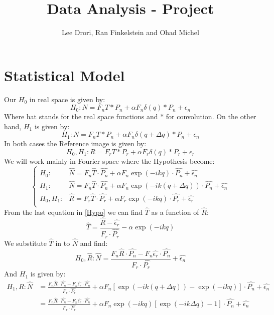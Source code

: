 \documentclass[a4paper]{article}
\title{Data Analysis - Project}
\author{Lee Drori, Ran Finkelstein and Ohad Michel}
\newcommand{\rb}[1]{\left(#1\right)}
\newcommand{\sqb}[1]{\left[#1\right]}
\begin{document}
	\maketitle
	
	\section{Statistical Model}
	Our $H_0$ in real space is given by:
	\begin{equation}
	H_0 : N = F_n T * P_n + \alpha F_n \delta \rb{q} * P_n + \epsilon_n  
	\end{equation}
	Where hat stands for the real space functions and $*$ for convolution. On the other hand, $H_1$ is given by:
	\begin{equation}
	H_1 : N = F_n T * P_n + \alpha F_n \delta \rb{q + \Delta q} * P_n + \epsilon_n
	\end{equation}
	In both cases the Reference image is given by:
	\begin{equation}
	H_0,H_1 : R = F_r T * P_r + \alpha F_r \delta \rb{q} * P_r + \epsilon_r
	\end{equation}
	We will work mainly in Fourier space where the Hypothesis become:
	\begin{equation}\label{Hypo}
	\begin{cases}
	H_0: & \hat{N} = F_n \hat{T} \cdot \hat{P_n} + \alpha F_n \exp\rb{-ikq}\cdot \hat{P_n} + \hat{\epsilon_n}\\
	H_1: & \hat{N} = F_n \hat{T} \cdot \hat{P_n} + \alpha F_n \exp\rb{-ik\rb{q + \Delta q}}\cdot \hat{P_n} + \hat{\epsilon_n}\\
	H_0,H_1: & \hat{R} = F_r \hat{T} \cdot \hat{P_r} + \alpha F_r \exp\rb{-ikq}\cdot \hat{P_r} + \hat{\epsilon_r}\\
	\end{cases}
	\end{equation}
	From the last equation in \eqref{Hypo} we can find $\hat{T}$ as a function of $\hat{R}$:
	\begin{equation}
	\hat{T} = \frac{\hat{R} - \hat{\epsilon_r}}{F_r\cdot \hat{P_r}} -\alpha \exp\rb{-ikq}
	\end{equation}
	We substitute $\hat{T}$ in to $\hat{N}$ and find:
	\begin{equation}
	H_0,\hat{R} : \hat{N} = \frac{F_n \hat{R}\cdot \hat{P_n} - F_n \hat{\epsilon_r}\cdot \hat{P_n}}{F_r\cdot \hat{P_r}} + \hat{\epsilon_n}  
	\end{equation}
	And $H_1$ is given by:
	\begin{equation}
	\begin{split}
	H_1,R : \hat{N} & = \frac{F_n \hat{R}\cdot \hat{P_n} - F_n \hat{\epsilon_r}\cdot \hat{P_n}}{F_r\cdot \hat{P_r}} + \alpha F_n \sqb{\exp\rb{-ik\rb{q + \Delta q}} - \exp\rb{-ikq}}\cdot \hat{P_n} + \hat{\epsilon_n}\\
	& = \frac{F_n \hat{R}\cdot \hat{P_n} - F_n \hat{\epsilon_r}\cdot \hat{P_n}}{F_r\cdot \hat{P_r}} + \alpha F_n \exp\rb{-ikq} \sqb{\exp\rb{-ik\Delta q} - 1}\cdot \hat{P_n} + \hat{\epsilon_n}\\
	\end{split}
	\end{equation}
\end{document}
